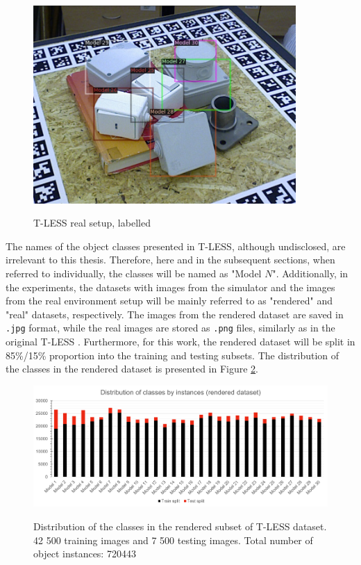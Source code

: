\documentclass[english, 12pt, a4paper, elec, utf8, a-1b, online]{aaltothesis}
\begin{document}
\begin{figure}[htb]
	\begin{center}
		\includegraphics[width=10cm]{./tless_real_annotated.png}
	\end{center}
	\caption{T-LESS real setup, labelled
\cite{hodan2017tless}}
	\begin{center}
		\label{tless_real_example}
	\end{center}
\end{figure}
\FloatBarrier

The names of the object classes presented in T-LESS, although undisclosed, are irrelevant to this thesis. Therefore, here and in the subsequent sections, when referred to individually, the classes will be named as "Model $N$". Additionally, in the experiments, the datasets with images from the simulator and the images from the real environment setup will be mainly referred to as "rendered" and "real" datasets, respectively. The images from the rendered dataset are saved in \texttt{.jpg} format, while the real images are stored as \texttt{.png} files, similarly as in the original T-LESS \cite{hodan2017tless}. Furthermore, for this work, the rendered dataset will be split in 85\%/15\%  proportion into the training and testing subsets. The distribution of the classes in the rendered dataset is presented in Figure \ref{tless_distribution}.  

\begin{figure}[htb]
	\begin{center}
		\includegraphics[width=14cm]{./rendered_distribution.png}
	\end{center}
	\caption{Distribution of the classes in the rendered subset of T-LESS dataset. 42 500 training images and 7 500 testing images. Total number of object instances: 720443}
	\begin{center}
		\label{tless_distribution}
	\end{center}
\end{figure}
\FloatBarrier
\end{document}
